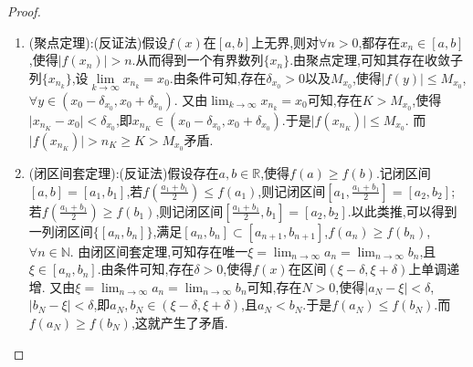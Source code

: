 \documentclass[../../main.tex]{subfiles}%
\begin{document}
\begin{proof}
\begin{enumerate}
{\color{blue}证法三(闭区间套定理):}(反证法)假设存在$a,b\in \mathbb{R}$,使得$f(a)\ne f(b)$.不妨设\(f(a) < f(b)\),则记闭区间\([a,b]=[a_1,b_1]\).若\(f(\frac{a_1 + b_1}{2}) > f(a_1)\),则记闭区间\([a_1,\frac{a_1 + b_1}{2}]=[a_2,b_2]\);若\(f(\frac{a_1 + b_1}{2}) < f(b_1)\),则记闭区间\([\frac{a_1 + b_1}{2},b_1]=[a_2,b_2]\).以此类推,可以得到一列闭区间\(\{[a_n,b_n]\}\),满足\([a_n,b_n]\subset [a_{n + 1},b_{n + 1}]\),\(f(a_n) < f(b_n)\),\(\forall n\in\mathbb{N}\).由闭区间套定理,可知存在唯一\(\xi=\lim_{n\rightarrow\infty}a_n=\lim_{n\rightarrow\infty}b_n\),且\(\xi\in [a_n,b_n]\).又由条件可知,存在\(r > 0\),使得\(f(t)=f(\xi)\),\(\forall t\in (\xi - r,\xi + r)\).从而存在充分大的\(N\in\mathbb{N}\),使得\(\vert a_N - \xi\vert < r\),\(\vert b_N - \xi\vert < r\),即\(a_N,b_N\in (\xi - r,\xi + r)\).于是\(f(a_N)=f(b_N)\),这与\(f(a_N) < f(b_N)\)矛盾.

\item {\color{blue}(聚点定理):}(反证法)假设$f(x)$在$[a,b]$上无界,则对$\forall n>0$,都存在$x_n\in[a,b]$,使得$\left| f\left( x_n \right) \right|>n$.从而得到一个有界数列$\{x_n\}$.由聚点定理,可知其存在收敛子列$\{x_{n_k}\}$,设$\underset{k\rightarrow \infty}{\lim}x_{n_k}=x_0$.由条件可知,存在\(\delta _{x_0}>0\)以及\(M_{x_0}\),使得\(\vert f(y)\vert\leqslant M_{x_0}\),\(\forall y\in(x_0 - \delta _{x_0},x_0+\delta _{x_0})\).
又由\(\lim_{k\rightarrow\infty}x_{n_k}=x_0\)可知,存在\(K > M_{x_0}\),使得\(\vert x_{n_K}-x_0\vert<\delta _{x_0}\),即\(x_{n_K}\in(x_0 - \delta _{x_0},x_0+\delta _{x_0})\).于是\(\vert f(x_{n_K})\vert\leqslant M_{x_0}\).
而\(\vert f(x_{n_K})\vert>n_K\geqslant K > M_{x_0}\)矛盾.

\item {\color{blue}(闭区间套定理):}(反证法)假设存在$a,b\in \mathbb{R}$,使得$f(a)\geqslant  f(b)$.记闭区间\([a,b]=[a_1,b_1]\),若\(f\left(\frac{a_1 + b_1}{2}\right) \leqslant f\left(a_1\right)\),则记闭区间\(\left[a_1,\frac{a_1 + b_1}{2}\right]=[a_2,b_2]\);若\(f\left(\frac{a_1 + b_1}{2}\right) \geqslant f\left(b_1\right)\),则记闭区间\(\left[\frac{a_1 + b_1}{2},b_1\right]=[a_2,b_2]\).以此类推,可以得到一列闭区间\(\{[a_n,b_n]\}\),满足\([a_n,b_n]\subset [a_{n + 1},b_{n + 1}]\),\(f(a_n)\geqslant f(b_n)\),\(\forall n\in \mathbb{N}\).
由闭区间套定理,可知存在唯一\(\xi = \lim_{n\rightarrow \infty} a_n = \lim_{n\rightarrow \infty} b_n\),且\(\xi \in [a_n,b_n]\).由条件可知,存在\(\delta > 0\),使得\(f\left(x\right)\)在区间\(\left(\xi - \delta,\xi + \delta\right)\)上单调递增.
又由\(\xi = \lim_{n\rightarrow \infty} a_n = \lim_{n\rightarrow \infty} b_n\)可知,存在\(N > 0\),使得\(\left|a_N - \xi\right| < \delta\),\(\left|b_N - \xi\right| < \delta\),即\(a_N,b_N\in \left(\xi - \delta,\xi + \delta\right)\),且\(a_N < b_N\).于是\(f\left(a_N\right) \leqslant f\left(b_N\right)\).而\(f\left(a_N\right) \geqslant f\left(b_N\right)\),这就产生了矛盾.
\end{enumerate}
\end{proof}
\end{document}
